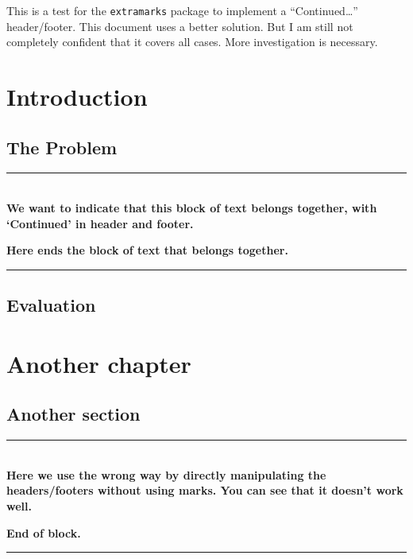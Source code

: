 \documentclass[openany]{book}
\begin{document}
\tableofcontents

\bigskip

This is a test for the \texttt{extramarks} package to implement a ``Continued\ldots'' header/footer. This document uses a better solution. But I am still not completely confident that it covers all cases. More investigation is necessary.

\newpage
{}
\chapter{Introduction}

\lipsum[1]

\section{The Problem}
\label{sec:problem}

\noindent\rule{\textwidth}{1mm}\\
\textbf{We want to indicate that this block of text belongs together, with `Continued' in header and footer.}

\lipsum[2]
\lipsum

\textbf{Here ends the  block of text that belongs together.}\\
\noindent\rule{\textwidth}{1mm}
\extramarks{}{}

\section{Evaluation}

\lipsum[3-9]

\chapter{Another chapter}

\label{cha:another-chapter}

\lipsum[2]

\section{Another section}

\lipsum[3-4]

\noindent\rule{\textwidth}{1mm}\\
\textbf{Here we use the wrong way by directly manipulating the headers/footers without using marks. You can see that it doesn't work well.}

\lipsum[5]

\textbf{End of block.}\\
\noindent\rule{\textwidth}{1mm}\\
\fancyhead[L]{}
\fancyfoot[R]{}
\end{document}
